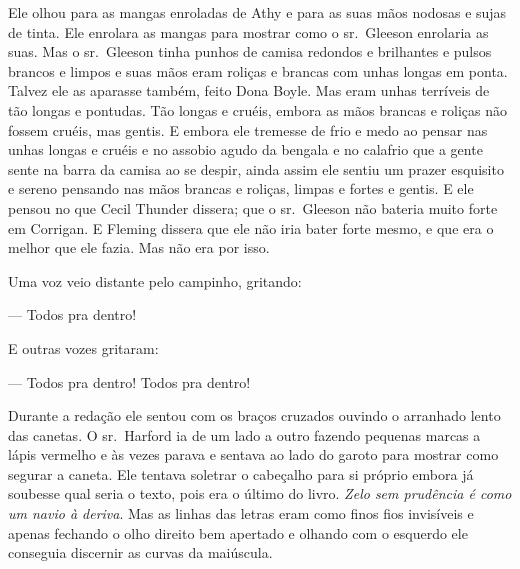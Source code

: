 Ele olhou para as mangas enroladas de Athy e para as suas mãos nodosas e
sujas de tinta. Ele enrolara as mangas para mostrar como o sr.~Gleeson
enrolaria as suas. Mas o sr.~Gleeson tinha punhos de camisa redondos e
brilhantes e pulsos brancos e limpos e suas mãos eram roliças e brancas
com unhas longas em ponta. Talvez ele as aparasse também, feito Dona
Boyle. Mas eram unhas terríveis de tão longas e pontudas. Tão longas e
cruéis, embora as mãos brancas e roliças não fossem cruéis, mas gentis.
E embora ele tremesse de frio e medo ao pensar nas unhas longas e
cruéis e no assobio agudo da bengala e no calafrio que a gente sente na
barra da camisa ao se despir, ainda assim ele sentiu um prazer
esquisito e sereno pensando nas mãos brancas e roliças, limpas e fortes
e gentis. E ele pensou no que Cecil Thunder dissera; que o sr.~Gleeson
não bateria muito forte em Corrigan. E Fleming dissera que ele não iria
bater forte mesmo, e que era o melhor que ele fazia. Mas não era por
isso.

Uma voz veio distante pelo campinho, gritando:

 --- Todos pra dentro!

E outras vozes gritaram:

 --- Todos pra dentro! Todos pra dentro!

Durante a redação ele sentou com os braços cruzados ouvindo o arranhado
lento das canetas. O sr.~Harford ia de um lado a outro fazendo pequenas
marcas a lápis vermelho e às vezes parava e sentava ao lado do garoto
para mostrar como segurar a caneta. Ele tentava soletrar o cabeçalho
para si próprio embora já soubesse qual seria o texto, pois era o
último do livro. \textit{Zelo sem prudência é como um navio à deriva}.
Mas as linhas das letras eram como finos fios invisíveis e apenas
fechando o olho direito bem apertado e olhando com o esquerdo 
ele conseguia discernir as curvas da maiúscula.

